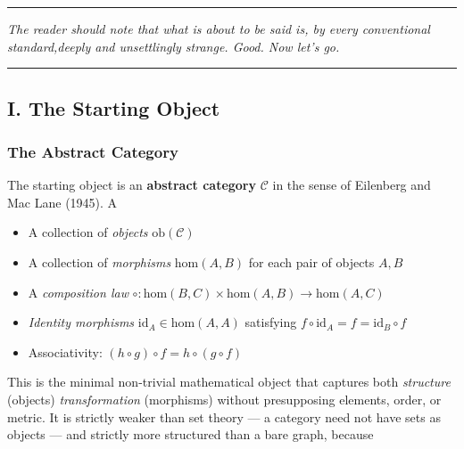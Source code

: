 \documentclass[12pt,a4paper]{article}
\begin{document}
\begin{center}
\rule{0.5\textwidth}{0.4pt}
\end{center}

\begin{center}
\emph{The reader should note that what is about to be said is, by every conventional standard,deeply and unsettlingly strange. Good. Now let's go.}
\end{center}

\begin{center}
\rule{0.5\textwidth}{0.4pt}
\end{center}


\subsection{I. The Starting Object}

\subsubsection{The Abstract Category}
The starting object is an \textbf{abstract category} $\mathcal{C}$ in the sense of Eilenberg and Mac Lane (1945). A

\begin{itemize}
 \item A collection of \emph{objects} $\text{ob}(\mathcal{C})$
 \item A collection of \emph{morphisms} $\text{hom}(A, B)$ for each pair of objects $A, B$
 \item A \emph{composition law} $\circ: \text{hom}(B,C) \times \text{hom}(A,B) \to
 \text{hom}(A,C)$
 \item \emph{Identity morphisms} $\text{id}_A \in \text{hom}(A,A)$ satisfying $f \circ
 \text{id}_A = f = \text{id}_B
\circ f$
 \item Associativity: $(h \circ g) \circ f = h \circ (g \circ f)$
\end{itemize}

This is the minimal non-trivial mathematical object that captures both \emph{structure} (objects)
\emph{transformation} (morphisms) without presupposing elements, order, or metric. It is strictly weaker than set
theory --- a category need not have sets as objects --- and strictly more structured than a bare graph, because
\
\end{document}

